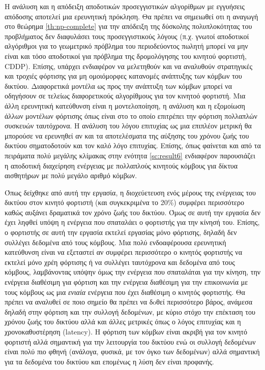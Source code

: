 Η ανάλυση και η απόδειξη αποδοτικών προσεγγιστικών αλγορίθμων με εγγυήσεις απόδοσης αποτελεί μια ερευνητική πρόκληση. Θα πρέπει να σημειωθεί οτι η αναγωγή στο
θεώρημα \ref{th:np-complete} για την απόδειξη της δύσκολης πολυπλοκότητας του προβλήματος δεν διαφυλάσει τους προσεγγιστικούς λόγους (π.χ. γνωτοί αποδοτικοί
αλγόριθμοι για το γεωμετρικό πρόβλημα του περιοδεύοντος πωλητή μπορεί να μην είναι και τόσο αποδοτικοί για πρόβλημα της δρομολόγησης του κινητού φορτιστή, CDDP).
Επίσης, υπάρχει ενδιαφέρον να μελετηθούν και να αναλυθούν στρατηγικές και τροχιές φόρτισης για μη ομοιόμορφες κατανομές ανάπτυξης των κόμβων του δικτύου. Διαφορετικά
μοντέλα ως προς την ανάπτυξη των κόμβων μπορεί να οδηγήσουν σε τελείως διαφορετικούς αλγορίθμους για τον κινητοό φορτιστή. Μια άλλη ερευνητική κατεύθυνση είναι
η μοντελοποίηση, η ανάλυση και η εξομοίωση άλλων μοντέλων φόρτισης όπως είναι στο \cite{multiple_devices} το οποίο επιτρέπει την φόρτιση πολλαπλών συσκευών
ταυτόχρονα. H ανάλυση του λόγου επιτυχίας ως μια επιπλέον μετρική θα μπορούσε να ερευνηθεί αν και τα αποτελέσματα της αύξησης του χρόνου ζωής του δικτύου
σηματοδοτούν και τον καλό λόγο επιτυχίας. Επίσης, όπως φαίνεται και από τα πειράματα πολύ μεγάλης κλίμακας στην ενότητα \ref{sc:result6} ενδιαφέρον παρουσιάζει η
αποδοτική διαχείρηση ενέργειας με πολλαπλούς κινητούς κόμβους για δίκτυα αισθητήρων με πολύ μεγάλο αριθμό κόμβων.


Όπως δείχθηκε από αυτή την εργασία, η διοχεύετευση ενός μέρους της ενέργειας του δικτύου στον κινητό φορτιστή (και συγκεκριμένα το 20\%) συμφέρει περισσότερο καθώς
αυξάνει δραματικά τον χρόνο ζωής του δικτύου. Όμως σε αυτή την εργασία δεν έχει ληφθεί υπόψη η ενέργεια που σπαταλάει ο φορτιστής για την κίνησή του. Επίσης, ο
φορτιστής σε αυτή την εργασία εκτελεί εργασίας μόνο φόρτισης, δηλαδή δεν συλλέγει δεδομένα από τους κόμβους. Μια πολύ ενδοαφέρουσα ερευνητική κατεύθυνση είναι να
εξεταστεί αν συμφέρει περισσότερο ο κινητός φορτιστής να εκτελεί μόνο χρέη φόρτισης ή να συλλέγει ταυτόχρονα και δεδομένα από τους κόμβους, λαμβάνοντας υπόψην όμως
την ενέργεια που σπαταλάται για την κίνηση, την ενέργεια διαθέσιμη για φόρτιση και την ενέργεια διαθέσιμη για την επικοινωνία με τους κόμβους ως μια \emph{ενιαία}
ενέργεια που έχει διαθέσιμη ο κινητός φορτιστής. Θα πρέπει να αναλυθεί σε ποιο σημείο θα πρέπει να δoθεί περισσότερο βάρος, ανάμεσα δηλαδή στην φόρτιση και την
συλλογή δεδομένων, με κύριο στόχο την επέκταση του χρόνου ζωής του δικτύου αλλά και άλλες μετρικές όπως ο λόγος επιτυχίας και η χρονοκαθυστέρηση (latency). Η φόρτιση
των κόμβων είναι ακριβή για τον κινητό φορτιστή αλλά σημαντική για την λειτουργία του δικτύου ενώ οι συλλογή δεδομένων είναι πολύ πιο φθηνή (ανάλογα, φυσικά, με τον
όγκο των δεδομένων) αλλά σημαντική για τα δεδομένα του δικτύου και επομένως η λύση δεν είναι προφανής.
